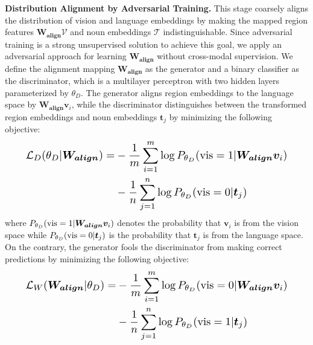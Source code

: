 \documentclass[letterpaper]{article} \usepackage{aaai24}  \usepackage{times}  \usepackage{helvet}  \usepackage{courier}  \usepackage[hyphens]{url}  \usepackage{graphicx} \urlstyle{rm} \def\UrlFont{\rm}  \usepackage{natbib}  \usepackage{caption} \frenchspacing  \setlength{\pdfpagewidth}{8.5in}  \setlength{\pdfpageheight}{11in}
\begin{document}
\noindent\textbf{Distribution Alignment by Adversarial Training.} 
This stage coarsely aligns the distribution of vision and language embeddings by making the mapped region features $\boldsymbol{W_{{align}}}\mathcal{V}$ and noun embeddings $\mathcal{T}$ indistinguishable. Since adversarial training is a strong unsupervised solution to achieve this goal, we apply an adversarial approach for learning $\boldsymbol{W_{{align}}}$ without cross-modal supervision. 
We define the alignment mapping $\boldsymbol{W_{{align}}}$ as the generator and a binary classifier as the discriminator, which is a multilayer perceptron with two hidden layers parameterized by $\theta_D$. The generator aligns region embeddings to the language space by  $\boldsymbol{W_{{align}}}\boldsymbol{v}_i$, while the discriminator distinguishes between the transformed region embeddings and noun embeddings $\boldsymbol{t}_j$ by minimizing the following objective:
\begin{equation}
\resizebox{0.9\hsize}{!}{$\begin{aligned}
\mathcal{L}_D(\theta_D|\boldsymbol{W_{{align}}}) = &-\frac{1}{m}\sum_{i = 1}^m\log{P_{\theta_D}({\rm vis} = 1|\boldsymbol{W_{{align}}}\boldsymbol{v}_i)} \\
                                                    &-\frac{1}{n}\sum_{j = 1}^n\log{P_{\theta_D}({\rm vis} = 0|\boldsymbol{t}_j)} 
\end{aligned}$}
\label{f:2}
\end{equation}
where $P_{\theta_D}({\rm vis} = 1|\boldsymbol{W_{{align}}}\boldsymbol{v}_i)$ denotes the probability that $\boldsymbol{v}_i$ is from the vision space while $P_{\theta_D}({\rm vis} = 0|\boldsymbol{t}_j)$ is the probability that $\boldsymbol{t}_j$ is from the language space. On the contrary, the generator fools the discriminator from making correct predictions by minimizing the following objective:
\begin{equation}
\resizebox{0.9\hsize}{!}{$\begin{aligned}
\mathcal{L}_W(\boldsymbol{W_{align}}|\theta_D) = &-\frac{1}{m}\sum_{i = 1}^m\log{P_{\theta_D}({\rm vis} = 0|\boldsymbol{W_{{align}}}\boldsymbol{v}_i)} \\
                                                 &- \frac{1}{n}\sum_{j = 1}^n\log{P_{\theta_D}({\rm vis} = 1|\boldsymbol{t}_j)}
\end{aligned}$}
\label{f:3}
\end{equation}
\end{document}
